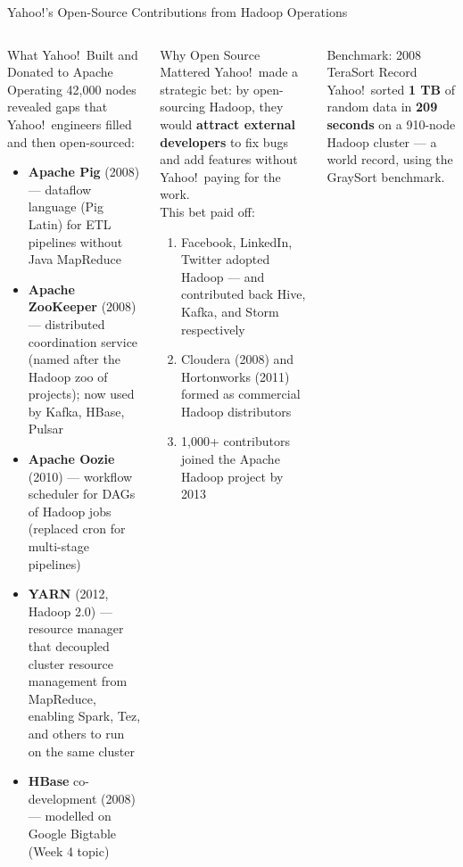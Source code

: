 \documentclass[aspectratio=169,10pt]{beamer}
\begin{document}
\begin{frame}{Yahoo!'s Open-Source Contributions from Hadoop Operations}
  \begin{columns}[T]
      \begin{block}{What Yahoo!\ Built and Donated to Apache}
        Operating 42{,}000 nodes revealed gaps that Yahoo!\ engineers
        filled and then open-sourced:
        \begin{itemize}
          \item \textbf{Apache Pig} (2008) — dataflow language
                (Pig Latin) for ETL pipelines without Java MapReduce
          \item \textbf{Apache ZooKeeper} (2008) — distributed
                coordination service (named after the Hadoop zoo of projects);
                now used by Kafka, HBase, Pulsar
          \item \textbf{Apache Oozie} (2010) — workflow scheduler for
                DAGs of Hadoop jobs (replaced cron for multi-stage pipelines)
          \item \textbf{YARN} (2012, Hadoop 2.0) — resource manager
                that decoupled cluster resource management from MapReduce,
                enabling Spark, Tez, and others to run on the same cluster
          \item \textbf{HBase} co-development (2008) — modelled on
                Google Bigtable (Week 4 topic)
        \end{itemize}
      \end{block}

      \begin{alertblock}{Why Open Source Mattered}
        Yahoo!\ made a strategic bet: by open-sourcing Hadoop,
        they would \textbf{attract external developers} to fix bugs
        and add features without Yahoo!\ paying for the work.\\[5pt]
        This bet paid off:
        \begin{enumerate}
          \item Facebook, LinkedIn, Twitter adopted Hadoop
                — and contributed back Hive, Kafka, and Storm respectively
          \item Cloudera (2008) and Hortonworks (2011) formed as
                commercial Hadoop distributors
          \item 1{,}000+ contributors joined the Apache Hadoop project
                by 2013
        \end{enumerate}
      \end{alertblock}
      \vspace{5pt}
      \begin{exampleblock}{Benchmark: 2008 TeraSort Record}
        Yahoo!\ sorted \textbf{1 TB} of random data in
        \textbf{209 seconds} on a 910-node Hadoop cluster —
        a world record, using the GraySort benchmark.
      \end{exampleblock}
  \end{columns}
\end{frame}
\end{document}
